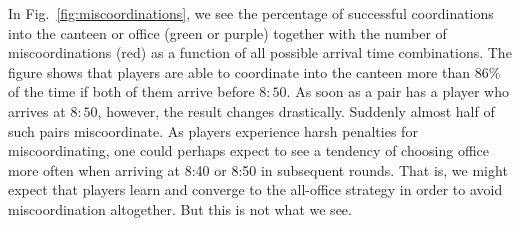 In Fig.~\ref{fig:miscoordinations}, we see the percentage of successful coordinations into the canteen or office (green or purple) together with the number of miscoordinations (red) as a function of all possible arrival time combinations. The figure shows that players are able to coordinate into the canteen more than 86\% of the time if both of them arrive before $8{:}50$. As soon as a pair has a player who arrives at $8{:}50$, however, the result changes drastically. Suddenly almost half of such pairs miscoordinate. As players experience harsh penalties for miscoordinating, one could perhaps expect to see a tendency of choosing office more often when arriving at 8:40 or 8:50 in subsequent rounds. That is, we might expect that players learn and converge to the all-office strategy in order to avoid miscoordination altogether. But this is not what we see.

